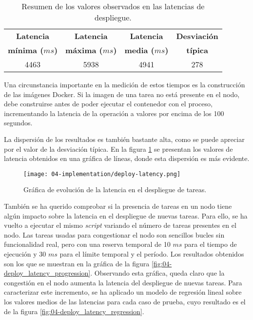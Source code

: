 \begin{table}[H]
    \centering
    \begin{tabular}{ | c | c | c | c | }
        \hline
        \textbf{Latencia}      & \textbf{Latencia}      & \textbf{Latencia}     & \textbf{Desviación} \\
        \textbf{mínima ($ms$)} & \textbf{máxima ($ms$)} & \textbf{media ($ms$)} & \textbf{típica}     \\
        \hline
        4463                   & 5938                   & 4941                  & 278                 \\
        \hline
    \end{tabular}
    \caption{Resumen de los valores observados en las latencias de despliegue.}
    \label{tab:04-deploy_latency}
\end{table}

Una circunstancia importante en la medición de estos tiempos es la construcción
de las imágenes Docker. Si la imagen de una tarea no está presente en el nodo, debe
construirse antes de poder ejecutar el contenedor con el proceso, incrementando
la latencia de la operación a valores por encima de los 100 segundos.

La dispersión de los resultados es también bastante alta, como se puede apreciar
por el valor de la desviación típica. En la figura \ref{fig:04-deploy_latency} se
presentan los valores de latencia obtenidos en una gráfica de líneas, donde esta
dispersión es más evidente.

\begin{figure}
    \centering
    \texttt{[image: 04-implementation/deploy-latency.png]}
    \caption{Gráfica de evolución de la latencia en el despliegue de tareas.}
    \label{fig:04-deploy_latency}
\end{figure}

También se ha querido comprobar si la presencia de tareas en un nodo tiene algún
impacto sobre la latencia en el despliegue de nuevas tareas. Para ello, se ha
vuelto a ejecutar el mismo \textit{script} variando el número de tareas
presentes en el nodo. Las tareas usadas para congestionar el nodo son sencillos
bucles sin funcionalidad real, pero con una reserva temporal de 10 $ms$ para el
tiempo de ejecución y 30 $ms$ para el límite temporal y el período. Los
resultados obtenidos son los que se muestran en la gráfica de la figura
\ref{fig:04-deploy_latency_progression}. Observando esta gráfica, queda claro
que la congestión en el nodo aumenta la latencia del despliegue de nuevas
tareas. Para caracterizar este incremento, se ha aplicado un modelo de regresión
lineal sobre los valores medios de las latencias para cada caso de prueba, cuyo
resultado es el de la figura \ref{fig:04-deploy_latency_regression}.

